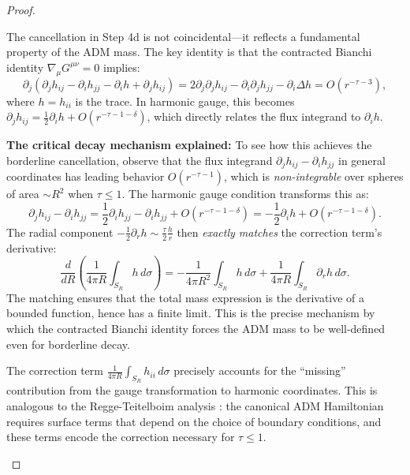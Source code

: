 \begin{proof}
\begin{remark}\label{rem:CancellationPhysics}
The cancellation in Step 4d is not coincidental---it reflects a fundamental property of the ADM mass. The key identity is that the contracted Bianchi identity $\nabla_\mu G^{\mu\nu} = 0$ implies:
\begin{equation}
    \partial_j\left(\partial_j h_{ij} - \partial_i h_{jj} - \partial_i h + \partial_j h_{ij}\right) = 2\partial_j\partial_j h_{ij} - \partial_i \partial_j h_{jj} - \partial_i \Delta h = O(r^{-\tau - 3}),
\end{equation}
where $h = h_{ii}$ is the trace. In harmonic gauge, this becomes $\partial_j h_{ij} = \frac{1}{2}\partial_i h + O(r^{-\tau-1-\delta})$, which directly relates the flux integrand to $\partial_i h$. 

\textbf{The critical decay mechanism explained:} To see how this achieves the borderline cancellation, observe that the flux integrand $\partial_j h_{ij} - \partial_i h_{jj}$ in general coordinates has leading behavior $O(r^{-\tau-1})$, which is \emph{non-integrable} over spheres of area $\sim R^2$ when $\tau \le 1$. The harmonic gauge condition transforms this as:
\begin{equation}
    \partial_j h_{ij} - \partial_i h_{jj} = \frac{1}{2}\partial_i h_{jj} - \partial_i h_{jj} + O(r^{-\tau-1-\delta}) = -\frac{1}{2}\partial_i h + O(r^{-\tau-1-\delta}).
\end{equation}
The radial component $-\frac{1}{2}\partial_r h \sim \frac{\tau}{2} \frac{h}{r}$ then \emph{exactly matches} the correction term's derivative:
\begin{equation}
    \frac{d}{dR}\left(\frac{1}{4\pi R}\int_{S_R} h\,d\sigma\right) = -\frac{1}{4\pi R^2}\int_{S_R} h\,d\sigma + \frac{1}{4\pi R}\int_{S_R} \partial_r h\,d\sigma.
\end{equation}
The matching ensures that the total mass expression is the derivative of a bounded function, hence has a finite limit. This is the precise mechanism by which the contracted Bianchi identity forces the ADM mass to be well-defined even for borderline decay.

The correction term $\frac{1}{4\pi R}\int_{S_R} h_{ii}\,d\sigma$ precisely accounts for the ``missing'' contribution from the gauge transformation to harmonic coordinates. This is analogous to the Regge-Teitelboim analysis \cite{regge1974}: the canonical ADM Hamiltonian requires surface terms that depend on the choice of boundary conditions, and these terms encode the correction necessary for $\tau \le 1$.


\end{remark}
\end{proof}
